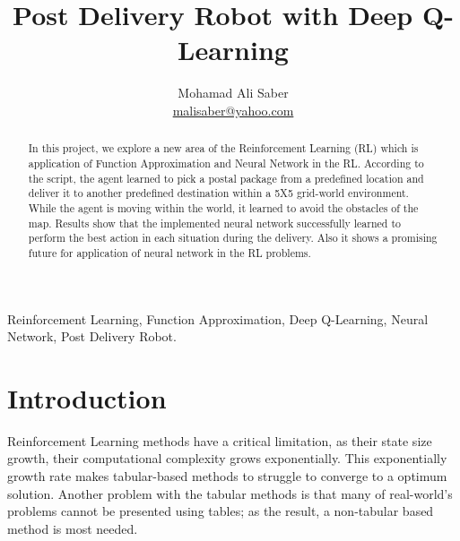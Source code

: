 \documentclass[lettersize,journal]{IEEEtran}
\begin{document}
\title{Post Delivery Robot with Deep Q-Learning}

\author{Mohamad Ali Saber\\ \href{mailto:malisaber@yahoo.com}{malisaber@yahoo.com}}




\maketitle






\begin{abstract}
In this project, we explore a new area of the Reinforcement Learning (RL) which is application of Function Approximation and Neural Network in the RL. According to the script, the agent learned to pick a postal package from a predefined location and deliver it to another predefined destination within a 5X5 grid-world environment. While the agent is moving within the world, it learned to avoid the obstacles of the map.
Results show that the implemented neural network successfully learned to perform the best action in each situation during the delivery. Also it shows a promising future for application of neural network in the RL problems.
\end{abstract}

\begin{IEEEkeywords}
Reinforcement Learning, Function Approximation, Deep Q-Learning, Neural Network, Post Delivery Robot.
\end{IEEEkeywords}




\section{Introduction}
 Reinforcement Learning methods have a critical limitation, as their state size growth, their computational complexity grows exponentially. This exponentially growth rate makes tabular-based methods to struggle to converge to a optimum solution. Another problem with the tabular methods is that many of real-world's problems cannot be presented using tables; as the result, a non-tabular based method is most needed.\par
\end{document}
